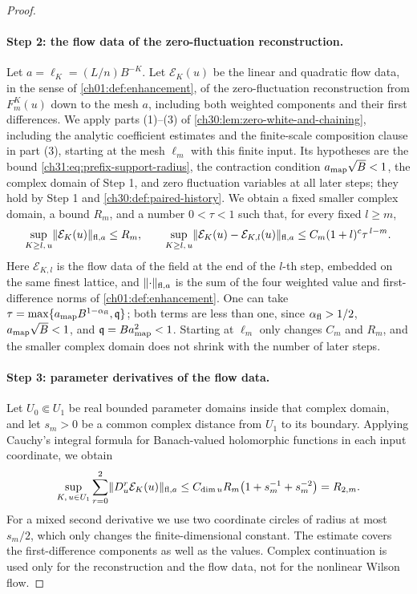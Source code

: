 \begin{proof}
\paragraph{Step 2: the flow data of the zero-fluctuation reconstruction.}
Let $a=\ell_K=(L/n)B^{-K}$. Let $\mathcal E_K(u)$ be the linear and quadratic flow data, in the sense of \cref{ch01:def:enhancement}, of the zero-fluctuation reconstruction from $F_m^K(u)$ down to the mesh $a$, including both weighted components and their first differences. We apply parts (1)--(3) of \cref{ch30:lem:zero-white-and-chaining}, including the analytic coefficient estimates and the finite-scale composition clause in part (3), starting at the mesh $\ell_m$ with this finite input. Its hypotheses are the bound \eqref{ch31:eq:prefix-support-radius}, the contraction condition $a_{\rm map}\sqrt B<1$, the complex domain of Step 1, and zero fluctuation variables at all later steps; they hold by Step 1 and \cref{ch30:def:paired-history}. We obtain a fixed smaller complex domain, a bound $R_m$, and a number $0<\tau<1$ such that, for every fixed $l\ge m$,
\begin{equation}\label{ch31:eq:needed-enhanced-reserve}
 \sup_{K\ge l,\,u}\lVert \mathcal E_K(u)\rVert_{\mathrm{fl},a}\le R_m,\qquad
 \sup_{K\ge l,\,u}\lVert \mathcal E_K(u)-\mathcal E_{K,l}(u)\rVert_{\mathrm{fl},a}\le C_m(1+l)^c\tau^{\,l-m}.
\end{equation}
Here $\mathcal E_{K,l}$ is the flow data of the field at the end of the $l$-th step, embedded on the same finest lattice, and $\lVert \cdot\rVert_{\mathrm{fl},a}$ is the sum of the four weighted value and first-difference norms of \cref{ch01:def:enhancement}. One can take $\tau=\max\{a_{\rm map}B^{1-\alpha_{\mathrm{fl}}},\mathfrak q\}$; both terms are less than one, since $\alpha_{\mathrm{fl}}>1/2$, $a_{\rm map}\sqrt B<1$, and $\mathfrak q=Ba_{\rm map}^2<1$. Starting at $\ell_m$ only changes $C_m$ and $R_m$, and the smaller complex domain does not shrink with the number of later steps.

\paragraph{Step 3: parameter derivatives of the flow data.}
Let $U_0\Subset U_1$ be real bounded parameter domains inside that complex domain, and let $s_m>0$ be a common complex distance from $U_1$ to its boundary. Applying Cauchy's integral formula for Banach-valued holomorphic functions in each input coordinate, we obtain
\begin{equation}\label{ch31:eq:enhanced-parameter-derivatives}
 \sup_{K,\,u\in U_1}\sum_{r=0}^2\lVert D_u^r\mathcal E_K(u)\rVert_{\mathrm{fl},a}\le C_{\dim u}R_m\bigl(1+s_m^{-1}+s_m^{-2}\bigr)=R_{2,m}.
\end{equation}
For a mixed second derivative we use two coordinate circles of radius at most $s_m/2$, which only changes the finite-dimensional constant. The estimate covers the first-difference components as well as the values. Complex continuation is used only for the reconstruction and the flow data, not for the nonlinear Wilson flow.


\end{proof}
